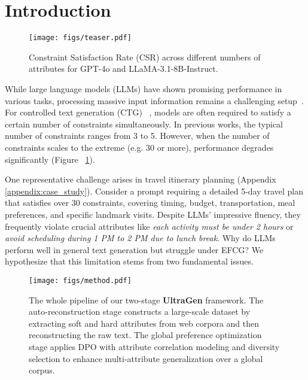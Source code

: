 \section{Introduction}
\begin{figure}[t] 
    \centering
        \texttt{[image: figs/teaser.pdf]}
    \caption{Constraint Satisfaction Rate (CSR) across different numbers of attributes for GPT-4o and LLaMA-3.1-8B-Instruct.}
    \vspace{-1.5em}
    \label{fig:teaser}
\end{figure}

While large language models (LLMs) have shown promising performance in various tasks, processing massive input information remains a challenging setup~\citep{lost-in-the-middle}.
For controlled text generation (CTG) ~\cite{wang2023aligning,song2024preference}, models are often required to satisfy a certain number of constraints simultaneously. In previous works, the typical number of constraints ranges from 3 to 5.
However, when the number of constraints scales to the extreme (e.g. 30 or more), performance degrades significantly (Figure ~\ref{fig:teaser}).

One representative challenge arises in travel itinerary planning (Appendix \ref{appendix:case_study}). Consider a prompt requiring a detailed 5-day travel plan that satisfies over 30 constraints, covering timing, budget, transportation, meal preferences, and specific landmark visits. Despite LLMs’ impressive fluency, they frequently violate crucial attributes like \textit{each activity must be under 2 hours} or \textit{avoid scheduling during 1 PM to 2 PM due to lunch break}. Why do LLMs perform well in general text generation but struggle under EFCG? We hypothesize that this limitation stems from two fundamental issues.

\begin{figure*}[t]
    \centering
        \texttt{[image: figs/method.pdf]}
    \caption{The whole pipeline of our two-stage \textbf{UltraGen} framework. The auto-reconstruction stage constructs a large-scale dataset by extracting soft and hard attributes from web corpora and then reconstructing the raw text. The global preference optimization stage applies DPO with attribute correlation modeling and diversity selection to enhance multi-attribute generalization over a global corpus.
    }
    \label{fig:pipeline}
    \vspace{-0.5em}
\end{figure*}

